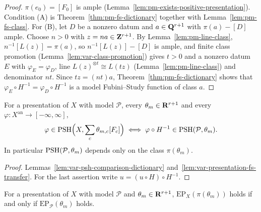 \begin{proof}
$\pi(e_0)=[F_0]$ is ample (Lemma~\ref{lem:pm-exists-positive-presentation}). Condition (A) is
Theorem~\ref{thm:pm-fs-dictionary} together with Lemma~\ref{lem:pm-fs-class}. For (B), let $D$
be a nonzero datum and $a\in\mathbf{Q}^{r+1}$ with $\pi(a)-[D]$ ample. Choose $n>0$ with
$z=na\in\mathbf{Z}^{r+1}$. By Lemma~\ref{lem:pm-line-class}, $n^{-1}[L(z)]=\pi(a)$, so
$n^{-1}[L(z)]-[D]$ is ample, and finite class promotion
(Lemma~\ref{lem:var-class-promotion}) gives $t>0$ and a nonzero datum $E$ with
$\varphi_E=\varphi_D$, line $L(z)^{\otimes t}\cong L(tz)$ (Lemma~\ref{lem:pm-line-class}) and
denominator $nt$. Since $tz=(nt)a$, Theorem~\ref{thm:pm-fs-dictionary} shows that
$\varphi_E\circ H^{-1}=\varphi_D\circ H^{-1}$ is a model Fubini--Study function of class $a$.
\end{proof}

\begin{theorem}
\label{thm:var-psh-comparison}
\leanok
{}
For a presentation of $X$ with model $\mathcal P$, every $\theta_m\in\mathbf{R}^{r+1}$ and every
$\varphi\colon X^{\mathrm{an}}\to[-\infty,\infty]$,
\[
 \varphi\in\operatorname{PSH}\Bigl(X,\sum_c\theta_{m,c}[F_c]\Bigr)
 \iff\varphi\circ H^{-1}\in\operatorname{PSH}(\mathcal P,\theta_m).
\]
In particular $\operatorname{PSH}(\mathcal P,\theta_m)$ depends only on the class $\pi(\theta_m)$.
\end{theorem}

\begin{proof}
Lemmas~\ref{lem:var-psh-comparison-dictionary} and~\ref{lem:var-presentation-fs-transfer}. For
the last assertion write $u=(u\circ H)\circ H^{-1}$.
\end{proof}

\begin{corollary}
\label{cor:var-ep-comparison}
\leanok
{}
For a presentation of $X$ with model $\mathcal P$ and $\theta_m\in\mathbf{R}^{r+1}$,
$\mathrm{EP}_X(\pi(\theta_m))$ holds if and only if $\mathrm{EP}_{\mathcal P}(\theta_m)$ holds.
\end{corollary}

